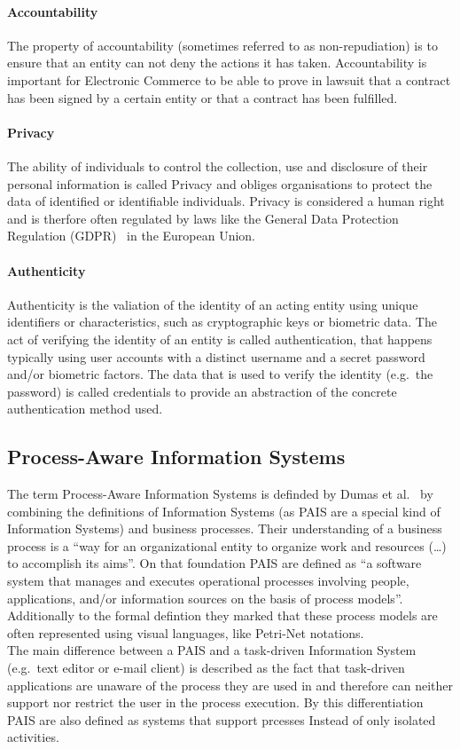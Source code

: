 \documentclass[runningheads]{llncs}
\begin{document}
\paragraph{Accountability} The property of accountability (sometimes referred to as non-repudiation) is to ensure that an entity can not deny the actions it has taken. Accountability is
important for Electronic Commerce to be able to prove in lawsuit that a contract has been signed by a certain entity or that a contract has been fulfilled.
\paragraph{Privacy} The ability of individuals to control the collection, use and disclosure of their personal information is called Privacy and obliges organisations to protect the data of
identified or identifiable individuals. Privacy is considered a human right~\cite{EU} and is therfore often regulated by laws like the General Data Protection Regulation (GDPR)~\cite{GDPR} in the European Union.
\paragraph{Authenticity} Authenticity is the valiation of the identity of an acting entity using unique identifiers or characteristics, such as cryptographic keys or biometric data.
The act of verifying the identity of an entity is called authentication, that happens typically using user accounts with a distinct username and a secret password and/or biometric factors.
The data that is used to verify the identity (e.g.\ the password) is called credentials to provide an abstraction of the concrete authentication method used.
\subsection{Process-Aware Information Systems}\label{PAIS}
The term Process-Aware Information Systems is definded by Dumas et al.~\cite{Dumas20051} by combining the definitions of Information Systems (as PAIS are a special kind of Information Systems)
and business processes. Their understanding of a business process is a ``way for an organizational entity to organize work and resources (\ldots) to accomplish its aims''. On that foundation
PAIS are defined as ``a software system that manages and executes operational processes involving people, applications, and/or information sources on the basis of process models''.
Additionally to the formal defintion they marked that these process models are often represented using visual languages, like Petri-Net notations.\\
The main difference between a PAIS and a task-driven Information System (e.g.\ text editor or e-mail client) is described as the fact that task-driven applications are unaware of the process
they are used in and therefore can neither support nor restrict the user in the process execution. By this differentiation PAIS are also defined as systems that support prcesses Instead of only isolated activities.\cite{vanderAalst2016}
\end{document}
